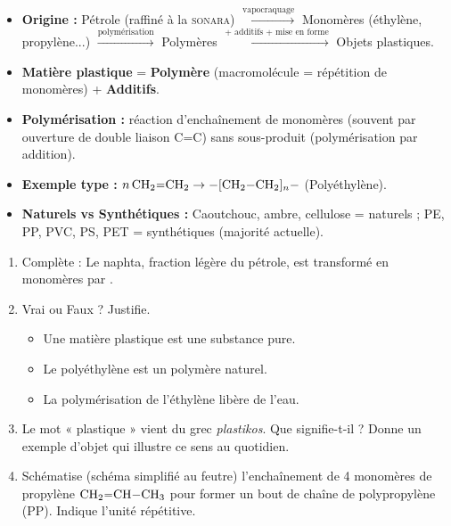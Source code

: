 \documentclass[11pt]{article}
\begin{document}
\begin{aretenir}
\begin{itemize}
\item \textbf{Origine :} Pétrole (raffiné à la \textsc{sonara}) $\xrightarrow{\text{vapocraquage}}$ Monomères (éthylène, propylène...) $\xrightarrow{\text{polymérisation}}$ Polymères $\xrightarrow{\text{+ additifs + mise en forme}}$ Objets plastiques.
\item \textbf{Matière plastique} = \textbf{Polymère} (macromolécule = répétition de monomères) + \textbf{Additifs}.
\item \textbf{Polymérisation :} réaction d'enchaînement de monomères (souvent par ouverture de double liaison C=C) sans sous-produit (polymérisation par addition).
\item \textbf{Exemple type :} $n\,\ce{CH2=CH2} \to \ce{-[CH2-CH2]_n-}$ (Polyéthylène).
\item \textbf{Naturels vs Synthétiques :} Caoutchouc, ambre, cellulose = naturels ; PE, PP, PVC, PS, PET = synthétiques (majorité actuelle).
\end{itemize}
\end{aretenir}

\begin{exercice}
\begin{enumerate}
\item Complète : Le naphta, fraction légère du pétrole, est transformé en monomères par \underline{\hspace{4cm}}.
\item Vrai ou Faux ? Justifie.
\begin{itemize}
\item[a)] Une matière plastique est une substance pure.
\item[b)] Le polyéthylène est un polymère naturel.
\item[c)] La polymérisation de l'éthylène libère de l'eau.
\end{itemize}
\item Le mot « plastique » vient du grec \emph{plastikos}. Que signifie-t-il ? Donne un exemple d'objet qui illustre ce sens au quotidien.
\item Schématise (schéma simplifié au feutre) l'enchaînement de 4 monomères de propylène $\ce{CH2=CH-CH3}$ pour former un bout de chaîne de polypropylène (PP). Indique l'unité répétitive.
\end{enumerate}
\end{exercice}
\end{document}
